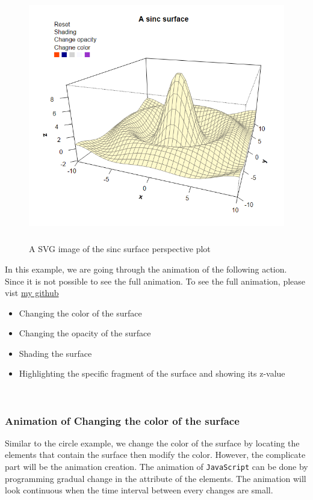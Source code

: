 \documentclass[paper=a4, fontsize=11pt]{report}
\begin{document}
\begin{figure}[h]
	\begin{center}
		\includegraphics[height = 11cm, width = 13cm]{figure/svg/origin_1.PNG}
		\caption{A SVG image of the sinc surface perspective plot}
		\label{Example_6.3.01}
	\end{center}
\end{figure}




In this example, we are going through the animation of the following action. Since it is not possible to see the full animation. To see the full animation, please vist \href{https://github.com/yeamin1/MasterProject/blob/master/report/svg}{my github}

\begin{itemize}
	\item Changing the color of the surface
	\item Changing the opacity of the surface
	\item Shading the surface
	\item Highlighting the specific fragment of the surface and showing its z-value  
\end{itemize}
\\

\subsubsection*{Animation of Changing the color of the surface}
Similar to the circle example, we change the color of the surface by locating the elements that contain the surface then modify the color. However, the complicate part will be the animation creation. The animation of \texttt{JavaScript} can be done by programming gradual change in the attribute of the elements. The animation will look continuous when the time interval between every changes are small.\\
\end{document}
